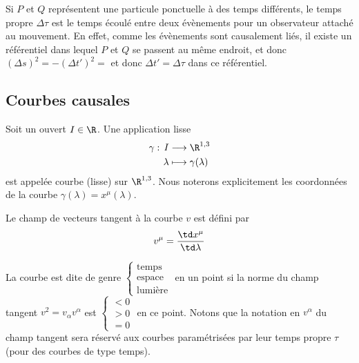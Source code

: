 {Si $P$ et $Q$ représentent une particule ponctuelle à des temps différents, le temps propre $\Delta \tau $ est le temps écoulé entre deux évènements pour un observateur attaché au mouvement. En effet, comme les évènements sont causalement liés, il existe un référentiel dans lequel $P$ et $Q$ se passent au même endroit, et donc $(\Delta s)^2=-(\Delta t')^2 =$ et donc $\Delta t' = \Delta \tau$ dans ce référentiel.

\subsection{Courbes causales}
\vspace{5pt}
\begin{theoremframe}
    \begin{rap}
        Soit un ouvert $I \in \R$. Une application lisse
        \begin{align}
            \gamma :\, I &\longrightarrow \R^{1,3}\\ \lambda &\longmapsto \gamma(\lambda)
        \end{align}
         est appelée courbe (lisse) sur $\R^{1,3}$. Nous noterons explicitement les coordonnées de la courbe $\gamma(\lambda) = x^\mu (\lambda)$.
    \end{rap}
\end{theoremframe}
\begin{theoremframe}
    \begin{propri}
        Le champ de vecteurs tangent à la courbe $v$ est défini par
        \begin{equation}
            v^\mu = \frac{\td x^\mu}{\td \lambda}
        \end{equation}
    \end{propri}
\end{theoremframe}
La courbe est dite de genre $\left\{
\begin{array}{l}
 \text{temps} \\
 \text{espace}\\
 \text{lumière}
\end{array}
\right.$ en un point
si la norme du champ tangent $ v^2 = v_{\alpha}v^{\alpha}$ est
$\left\{
\begin{array}{l}
 < 0 \\
 > 0\\
 = 0
\end{array}
\right.$ en ce point. Notons que la notation en $v^\alpha$ du champ tangent sera réservé aux courbes paramétrisées par leur temps propre $\tau$ (pour des courbes de type temps).
}
